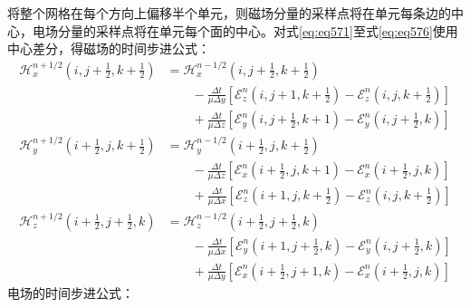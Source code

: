 \documentclass{article}
\numberwithin{equation}{section}
\begin{document}
\par
将整个网格在每个方向上偏移半个单元，则磁场分量的采样点将在单元每条边的中心，电场分量的采样点将在单元每个面的中心。对式\ref{eq:eq571}至式\ref{eq:eq576}使用中心差分，得磁场的时间步进公式：
\begin{align}
    \label{eq:eq577}
    \mathcal{H}_x^{n+1/2}\left(i,j+\frac{1}{2},k+\frac{1}{2}\right)&=\mathcal{H}_x^{n-1/2}\left(i,j+\frac{1}{2},k+\frac{1}{2}\right) \nonumber \\
                                                                   &\qquad-\frac{\Delta t}{\mu \Delta y}\left[\mathcal{E}_z^{n}\left(i,j+1,k+\frac{1}{2}\right)-\mathcal{E}_z^{n}\left(i,j,k+\frac{1}{2}\right)\right] \nonumber \\
                                                                   &\qquad+\frac{\Delta t}{\mu \Delta z}\left[\mathcal{E}_y^{n}\left(i,j+\frac{1}{2},k+1\right)-\mathcal{E}_y^{n}\left(i,j+\frac{1}{2},k\right)\right] \\
    \label{eq:eq578}
    \mathcal{H}_y^{n+1/2}\left(i+\frac{1}{2},j,k+\frac{1}{2}\right)&=\mathcal{H}_y^{n-1/2}\left(i+\frac{1}{2},j,k+\frac{1}{2}\right) \nonumber \\
                                                                   &\qquad-\frac{\Delta t}{\mu \Delta z}\left[\mathcal{E}_x^{n}\left(i+\frac{1}{2},j,k+1\right)-\mathcal{E}_x^{n}\left(i+\frac{1}{2},j,k\right)\right] \nonumber \\
                                                                   &\qquad+\frac{\Delta t}{\mu \Delta x}\left[\mathcal{E}_z^{n}\left(i+1,j,k+\frac{1}{2}\right)-\mathcal{E}_z^{n}\left(i,j,k+\frac{1}{2}\right)\right] \\
    \label{eq:eq579}
    \mathcal{H}_z^{n+1/2}\left(i+\frac{1}{2},j+\frac{1}{2},k\right)&=\mathcal{H}_z^{n-1/2}\left(i+\frac{1}{2},j+\frac{1}{2},k\right) \nonumber \\
                                                                   &\qquad-\frac{\Delta t}{\mu \Delta x}\left[\mathcal{E}_y^{n}\left(i+1,j+\frac{1}{2},k\right)-\mathcal{E}_y^{n}\left(i,j+\frac{1}{2},k\right)\right] \nonumber \\
                                                                   &\qquad+\frac{\Delta t}{\mu \Delta y}\left[\mathcal{E}_x^{n}\left(i+\frac{1}{2},j+1,k\right)-\mathcal{E}_x^{n}\left(i+\frac{1}{2},j,k\right)\right]
\end{align}
电场的时间步进公式：
\end{document}
